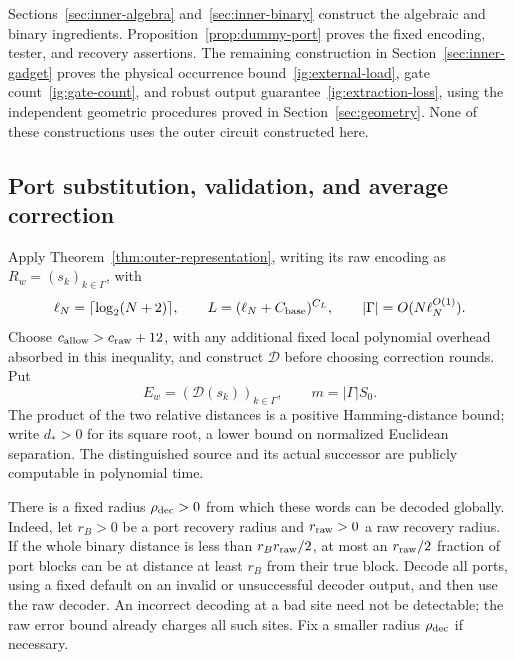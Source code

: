 Sections~\ref{sec:inner-algebra} and~\ref{sec:inner-binary} construct the
algebraic and binary ingredients. Proposition~\ref{prop:dummy-port}
proves the fixed encoding, tester, and recovery assertions. The remaining
construction in Section~\ref{sec:inner-gadget} proves the physical occurrence
bound~\eqref{ig:external-load}, gate count~\eqref{ig:gate-count}, and robust
output guarantee~\eqref{ig:extraction-loss}, using the independent geometric
procedures proved in Section~\ref{sec:geometry}. None of these constructions
uses the outer circuit constructed here.

\subsection{Port substitution, validation, and average correction}

Apply Theorem~\ref{thm:outer-representation}, writing its raw encoding as
$R_w=(s_k)_{k\in\Gamma}$, with
\[
 \ell_N=\lceil\log_2(N+2)\rceil,\qquad
 L=(\ell_N+C_{\rm base})^{C_L},\qquad
 |\Gamma|=O(N\ell_N^{O(1)}).
\]
Choose $c_{\rm allow}>c_{\rm raw}+12$, with any additional fixed local
polynomial overhead absorbed in this inequality, and construct
$\mathcal D$ before choosing correction rounds. Put
\begin{equation}\label{out:binary-encoding}
 E_w=(\mathcal D(s_k))_{k\in\Gamma},\qquad m=|\Gamma|S_0.
\end{equation}
The product of the two relative distances is a positive Hamming-distance
bound; write $d_*>0$ for its square root, a lower bound on normalized
Euclidean separation. The distinguished source and its actual successor are publicly computable in polynomial time.

There is a fixed radius $\rho_{\rm dec}>0$ from which these words can be
decoded globally. Indeed, let $r_B>0$ be a port recovery radius and
$r_{\rm raw}>0$ a raw recovery radius. If the whole binary distance is
less than $r_Br_{\rm raw}/2$, at most an $r_{\rm raw}/2$ fraction of port
blocks can be at distance at least $r_B$ from their true block. Decode
all ports, using a fixed default on an invalid or unsuccessful decoder
output, and then use the raw decoder. An incorrect decoding at a bad
site need not be detectable; the raw error bound already charges all
such sites. Fix a smaller radius $\rho_{\rm dec}$ if necessary.

